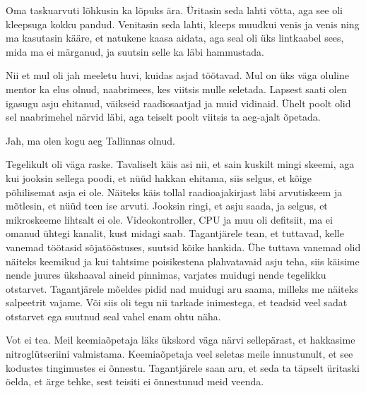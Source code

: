 Oma taskuarvuti lõhkusin ka lõpuks ära. Üritasin seda lahti võtta, aga 
see oli kleepsuga kokku pandud. Venitasin seda lahti, 
kleeps muudkui venis ja venis ning ma kasutasin kääre, et natukene 
kaasa aidata, aga seal oli üks lintkaabel sees, mida ma ei märganud, ja suutsin 
selle ka läbi hammustada.

Nii et mul oli jah meeletu huvi, kuidas asjad töötavad. Mul on üks väga oluline mentor ka elus olnud, naabrimees, kes viitsis 
mulle seletada. Lapsest saati olen igasugu asju ehitanud, 
väikseid raadiosaatjad ja muid vidinaid. Ühelt poolt olid sel naabrimehel 
närvid läbi, aga teiselt poolt viitsis ta aeg-ajalt õpetada. 


Jah, ma olen kogu aeg Tallinnas olnud. 


Tegelikult oli väga raske. Tavaliselt käis asi nii, et sain kuskilt 
mingi skeemi, aga 
kui jooksin sellega poodi, et nüüd hakkan ehitama, siis selgus, et 
kõige põhilisemat asja ei ole. Näiteks käis tollal 
raadioajakirjast läbi arvutiskeem ja mõtlesin, et nüüd teen ise arvuti. Jooksin ringi, et asju saada, ja selgus, et mikroskeeme lihtsalt ei ole. 
Videokontroller, CPU ja muu oli defitsiit, ma ei omanud ühtegi kanalit, kust 
midagi saab. Tagantjärele tean, et tuttavad, kelle vanemad töötasid 
sõjatööstuses, suutsid kõike hankida. Ühe tuttava vanemad olid näiteks 
keemikud ja kui tahtsime poisikestena plahvatavaid asju teha, 
siis käisime nende juures ükshaaval aineid pinnimas, 
varjates muidugi nende tegelikku otstarvet. Tagantjärele mõeldes 
pidid nad muidugi aru saama, 
milleks me näiteks salpeetrit vajame. Või siis oli tegu nii tarkade 
inimestega, et teadsid veel sadat otstarvet ega suutnud seal vahel enam 
ohtu näha. 


Vot ei tea. Meil keemiaõpetaja läks ükskord väga närvi sellepärast, et 
hakkasime nitroglütseriini valmistama. Keemiaõpetaja veel seletas meile 
innustunult, et see kodustes tingimustes ei õnnestu. Tagantjärele
saan aru, et seda ta täpselt üritaski öelda, et ärge tehke, 
sest teisiti ei õnnestunud meid veenda. 

